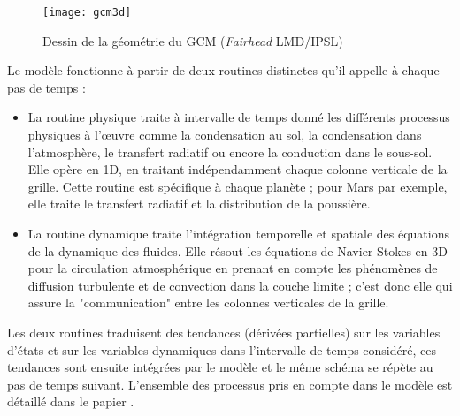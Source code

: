 \documentclass[11pt,a4paper]{article}
\begin{document}
\begin{figure}[h!]
\begin{center}
\texttt{[image: gcm3d]}
\caption{ Dessin de la géométrie du GCM (\emph{Fairhead }LMD/IPSL)}
\label{gcm3d}
\end{center}
\end{figure}

Le modèle fonctionne à partir de deux routines distinctes qu'il appelle à chaque pas de temps :
\begin{itemize}
\item La routine physique traite à intervalle de temps donné les différents processus physiques à l'\oe{}uvre comme la condensation au sol, la condensation dans l'atmosphère, le transfert radiatif ou encore la conduction dans le sous-sol. Elle opère en 1D, en traitant indépendamment chaque colonne verticale de la grille. Cette routine est spécifique à chaque planète ; pour Mars par exemple, elle traite le transfert radiatif et la distribution de la poussière.
\item La routine dynamique traite l'intégration temporelle et spatiale des équations de la dynamique des fluides. Elle résout les équations de Navier-Stokes en 3D pour la circulation atmosphérique en prenant en compte les phénomènes de diffusion turbulente et de convection dans la couche limite ; c'est donc elle qui assure la "communication" entre les colonnes verticales de la grille. \\
\end{itemize}
Les deux routines traduisent des tendances (dérivées partielles) sur les variables d'états et sur les variables dynamiques dans l'intervalle de temps considéré, ces tendances sont ensuite intégrées par le modèle et le même schéma se répète au pas de temps suivant. L'ensemble des processus pris en compte dans le modèle est détaillé dans le papier \cite{Forg:99}. \\
\end{document}
